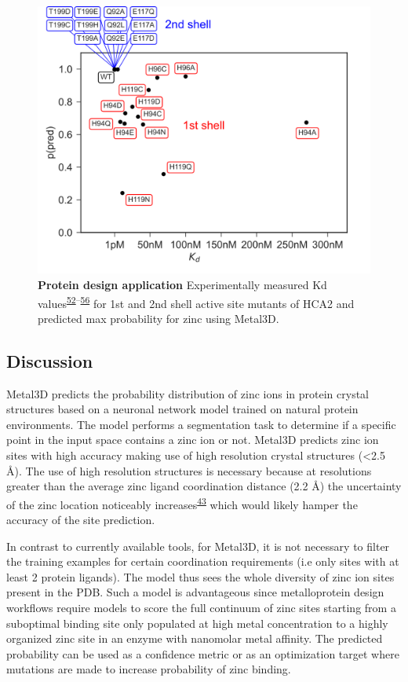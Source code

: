 \documentclass[  ASAPversion,
  ,
  9pt]{elife}
\begin{document}
\begin{figure}
\hypertarget{fig:hca-kd}{%
\centering
\includegraphics{images/kd_vs_p_nolog_newmethod_newmodel_0.5.png}
\caption{\textbf{Protein design application} Experimentally measured Kd values\textsuperscript{\protect\hyperlink{ref-D3VQQdjb}{52}--\protect\hyperlink{ref-TNbPH3Y1}{56}} for 1st and 2nd shell active site mutants of HCA2 and predicted max probability for zinc using Metal3D.}\label{fig:hca-kd}
}
\end{figure}

\hypertarget{discussion}{%
\subsection{Discussion}\label{discussion}}

Metal3D predicts the probability distribution of zinc ions in protein crystal structures based on a neuronal network model trained on natural protein environments. The model performs a segmentation task to determine if a specific point in the input space contains a zinc ion or not. Metal3D predicts zinc ion sites with high accuracy making use of high resolution crystal structures (\textless2.5 Å). The use of high resolution structures is necessary because at resolutions greater than the average zinc ligand coordination distance (2.2 Å) the uncertainty of the zinc location noticeably increases\textsuperscript{\protect\hyperlink{ref-Wt0ducot}{43}} which would likely hamper the accuracy of the site prediction.

In contrast to currently available tools, for Metal3D, it is not necessary to filter the training examples for certain coordination requirements (i.e only sites with at least 2 protein ligands). The model thus sees the whole diversity of zinc ion sites present in the PDB. Such a model is advantageous since metalloprotein design workflows require models to score the full continuum of zinc sites starting from a suboptimal binding site only populated at high metal concentration to a highly organized zinc site in an enzyme with nanomolar metal affinity. The predicted probability can be used as a confidence metric or as an optimization target where mutations are made to increase probability of zinc binding.
\end{document}
